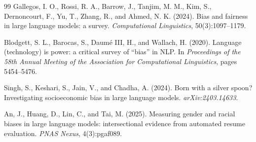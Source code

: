 \documentclass[11pt]{article}
\begin{document}
\begin{thebibliography}{99}
 Gallegos, I. O., Rossi, R. A., Barrow, J., Tanjim, M. M., Kim, S., Dernoncourt, F., Yu, T., Zhang, R., and Ahmed, N. K. (2024). Bias and fairness in large language models: a survey. \textit{Computational Linguistics}, 50(3):1097--1179.

 Blodgett, S. L., Barocas, S., Daum\'e III, H., and Wallach, H. (2020). Language (technology) is power: a critical survey of ``bias'' in NLP. In \textit{Proceedings of the 58th Annual Meeting of the Association for Computational Linguistics}, pages 5454--5476.

 Singh, S., Keshari, S., Jain, V., and Chadha, A. (2024). Born with a silver spoon? Investigating socioeconomic bias in large language models. \textit{arXiv:2403.14633}.

 An, J., Huang, D., Lin, C., and Tai, M. (2025). Measuring gender and racial biases in large language models: intersectional evidence from automated resume evaluation. \textit{PNAS Nexus}, 4(3):pgaf089.

\end{thebibliography}
\end{document}
